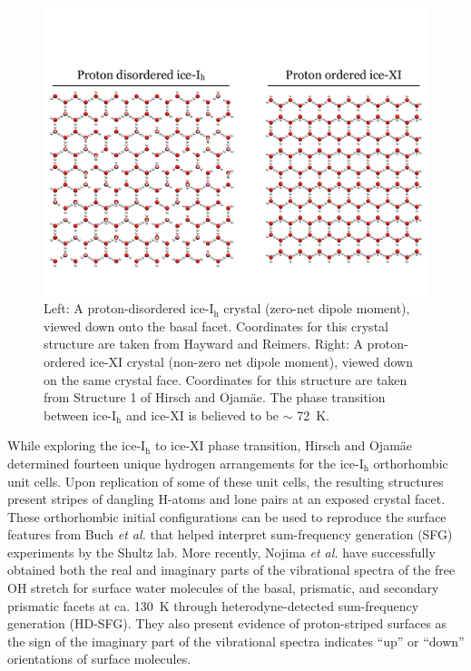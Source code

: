 \begin{figure} 
\includegraphics[width=\linewidth]{Figures/iceTransition}
\caption{\label{fig:iceTransition}Left: A proton-disordered
  ice-I$_\mathrm{h}$ crystal (zero-net dipole moment), viewed down
  onto the basal facet. Coordinates for this crystal structure are
  taken from Hayward and Reimers.\cite{Hayward1997} Right: A
  proton-ordered ice-XI crystal (non-zero net dipole moment), viewed
  down on the same crystal face. Coordinates for this structure are
  taken from Structure 1 of Hirsch and Ojam\"{a}e.\cite{Hirsch2004}
  The phase transition between ice-I$_\mathrm{h}$ and ice-XI is
  believed to be $\sim$ 72~K.}
\end{figure}

While exploring the ice-I$_\mathrm{h}$ to ice-XI phase transition, Hirsch
and Ojam\"{a}e determined fourteen unique hydrogen arrangements for the
ice-I$_\mathrm{h}$ orthorhombic unit cells.\cite{Hirsch2004} Upon
replication of some of these unit cells, the resulting structures
present stripes of dangling H-atoms and lone pairs at an exposed
crystal facet. These orthorhombic initial configurations can be used
to reproduce the surface features from Buch \textit{et
  al.}\cite{Buch2008} that helped interpret sum-frequency generation
(SFG) experiments by the Shultz lab.\cite{Groenzin2007} More recently,
Nojima \textit{et al.}\cite{Nojima2017} have successfully obtained
both the real and imaginary parts of the vibrational spectra of the
free OH stretch for surface water molecules of the basal, prismatic,
and secondary prismatic facets at ca. 130~K through
heterodyne-detected sum-frequency generation (HD-SFG). They also
present evidence of proton-striped surfaces as the sign of the
imaginary part of the vibrational spectra indicates ``up'' or ``down''
orientations of surface molecules.

